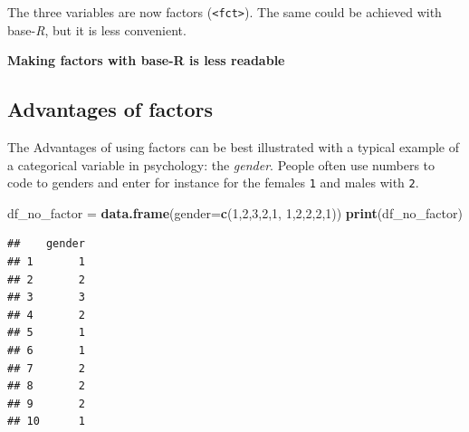 \documentclass[
]{scrartcl}
\newenvironment{Shaded}{\begin{snugshade}}{\end{snugshade}}
\newcommand{\DataTypeTok}[1]{\textcolor[rgb]{0.13,0.29,0.53}{#1}}
\newcommand{\DecValTok}[1]{\textcolor[rgb]{0.00,0.00,0.81}{#1}}
\newcommand{\KeywordTok}[1]{\textcolor[rgb]{0.13,0.29,0.53}{\textbf{#1}}}
\newcommand{\NormalTok}[1]{#1}
\newcommand{\OperatorTok}[1]{\textcolor[rgb]{0.81,0.36,0.00}{\textbf{#1}}}
\newcommand{\StringTok}[1]{\textcolor[rgb]{0.31,0.60,0.02}{#1}}
\newenvironment{webexsolution}[1]
    {\par\tiny\textbf{#1}}
    {\par}
\newcommand{\webexhide}[1]{\begin{webexsolution}{#1}}
\newcommand{\webexunhide}{\end{webexsolution}}
\begin{document}
The three variables are now factors (\texttt{\textless{}fct\textgreater{}}). The same could be achieved with base-\emph{R}, but it is less convenient.

\webexhide{Making factors with base-R is less readable}

\begin{Shaded}
\end{Shaded}

\webexunhide

\hypertarget{advantages-of-factors}{%
\subsection{Advantages of factors}\label{advantages-of-factors}}

The Advantages of using factors can be best illustrated with a typical example of a categorical variable in psychology: the \emph{gender}. People often use numbers to code to genders and enter for instance for the females \texttt{1} and males with \texttt{2}.

\begin{Shaded}
\begin{Highlighting}[]
\NormalTok{df\_no\_factor =}\StringTok{ }\KeywordTok{data.frame}\NormalTok{(}\DataTypeTok{gender=}\KeywordTok{c}\NormalTok{(}\DecValTok{1}\NormalTok{,}\DecValTok{2}\NormalTok{,}\DecValTok{3}\NormalTok{,}\DecValTok{2}\NormalTok{,}\DecValTok{1}\NormalTok{, }\DecValTok{1}\NormalTok{,}\DecValTok{2}\NormalTok{,}\DecValTok{2}\NormalTok{,}\DecValTok{2}\NormalTok{,}\DecValTok{1}\NormalTok{))}
\KeywordTok{print}\NormalTok{(df\_no\_factor)}
\end{Highlighting}
\end{Shaded}

\begin{verbatim}
##    gender
## 1       1
## 2       2
## 3       3
## 4       2
## 5       1
## 6       1
## 7       2
## 8       2
## 9       2
## 10      1
\end{verbatim}
\end{document}

